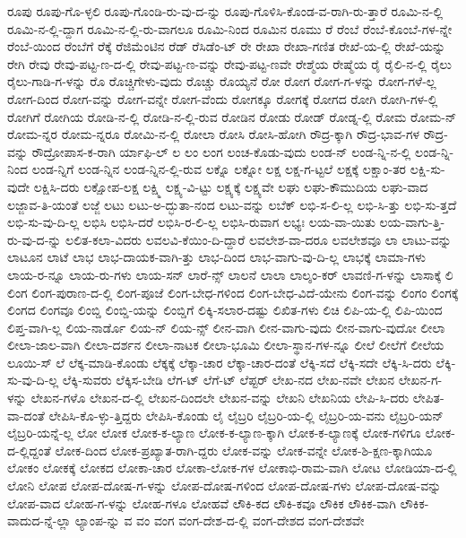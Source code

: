 {ರೂಪು
ರೂಪು-ಗೊ-ಳ್ಳಲಿ
ರೂಪು-ಗೊಂಡಿ-ರು-ವು-ದ-ನ್ನು
ರೂಪು-ಗೊಳಿಸಿ-ಕೊಂಡ-ವ-ರಾಗಿ-ರು-ತ್ತಾರೆ
ರೂಮಿ-ನ-ಲ್ಲಿ
ರೂಮಿ-ನ-ಲ್ಲಿ-ದ್ದಾಗ
ರೂಮಿ-ನ-ಲ್ಲಿ-ರು-ವಾಗಲೂ
ರೂಮಿ-ನಿಂದ
ರೂಮಿನ
ರೂಮು
ರೆ
ರೆಂಬೆ
ರೆಂಬೆ-ಕೊಂಬೆ-ಗಳ-ನ್ನೇ
ರೆಂಬೆ-ಯಿಂದ
ರೆಂಬೆಗೆ
ರೆಕ್ಕೆ
ರೆಜಿಮೆಂಟಿನ
ರೆಡ್
ರೆಸಿಡೆಂ-ಟ್
ರೇ
ರೇಖಾ
ರೇಖಾ-ಗಣಿತ
ರೇಖೆ-ಯ-ಲ್ಲಿ
ರೇಖೆ-ಯನ್ನು
ರೇಗಿ
ರೇವು
ರೇವು-ಪಟ್ಟ-ಣ-ದ-ಲ್ಲಿ
ರೇವು-ಪಟ್ಟ-ಣ-ವನ್ನು
ರೇವು-ಪಟ್ಟ-ಣವೇ
ರೇಶ್ಮೆಯ
ರೇಷ್ಮೆಯ
ರೈ
ರೈಲಿ-ನ-ಲ್ಲಿ
ರೈಲು
ರೈಲು-ಗಾಡಿ-ಗ-ಳನ್ನು
ರೊ
ರೊಚ್ಚಿಗೇಳು-ವುದು
ರೊಚ್ಚು
ರೊಯ್ಯನೆ
ರೋ
ರೋಗ
ರೋಗ-ಗ-ಳನ್ನು
ರೋಗ-ಗಳೆ-ಲ್ಲ
ರೋಗ-ದಿಂದ
ರೋಗ-ವನ್ನು
ರೋಗ-ವನ್ನೇ
ರೋಗ-ವೆಂದು
ರೋಗಕ್ಕೂ
ರೋಗಕ್ಕೆ
ರೋಗದ
ರೋಗಿ
ರೋಗಿ-ಗಳ-ಲ್ಲಿ
ರೋಗಿಗೆ
ರೋಗಿಯ
ರೋಡಿ-ನ-ಲ್ಲಿ
ರೋಡಿ-ನ-ಲ್ಲಿ-ರುವ
ರೋಡಿನ
ರೋಡು
ರೋಡ್
ರೋಡ್ನ-ಲ್ಲಿ
ರೋಮ
ರೋಮ-ನ್
ರೋಮ-ನ್ನರ
ರೋಮ-ನ್ನರೂ
ರೋಮಿ-ನ-ಲ್ಲಿ
ರೋಲಾ
ರೋಸಿ
ರೋಸಿ-ಹೋಗಿ
ರೌದ್ರ-ಕ್ಕಾಗಿ
ರೌದ್ರ-ಭಾವ-ಗಳ
ರೌದ್ರ-ವನ್ನು
ರೌದ್ರೋಪಾಸ-ಕ-ರಾಗಿ
ರ್ಯಾಫಿ-ಲ್
ಲ
ಲಂ
ಲಂಗ
ಲಂಚ-ಕೊಡು-ವುದು
ಲಂಡ-ನ್
ಲಂಡ-ನ್ನಿ-ನ-ಲ್ಲಿ
ಲಂಡ-ನ್ನಿ-ನಿಂದ
ಲಂಡ-ನ್ನಿಗೆ
ಲಂಡ-ನ್ನಿನ
ಲಂಡ-ನ್ನಿನ-ಲ್ಲಿ-ರುವ
ಲಕ್ನೊ
ಲಕ್ನೋ
ಲಕ್ಷ
ಲಕ್ಷ-ಗ-ಟ್ಟಲೆ
ಲಕ್ಷಕ್ಕೆ
ಲಕ್ಷಾಂ-ತರ
ಲಕ್ಷಿ-ಸು-ವುದೇ
ಲಕ್ಷಿಸಿ-ದರು
ಲಕ್ಷೋಪ-ಲಕ್ಷ
ಲಕ್ಷ್ಮಿ
ಲಕ್ಷ್ಯ-ವಿ-ಟ್ಟು
ಲಕ್ಷ್ಯಕ್ಕೆ
ಲಕ್ಷ್ಯವೇ
ಲಘು
ಲಘು-ಕೌಮುದಿಯ
ಲಘು-ವಾದ
ಲಜ್ಜಾವ-ತಿ-ಯಂತೆ
ಲಜ್ಜೆ
ಲಟು
ಲಟು-ಅ-ದ್ಭುತಾ-ನಂದ
ಲಟು-ವನ್ನು
ಲಬೆಕ್
ಲಭಿ-ಸ-ಲಿ-ಲ್ಲ
ಲಭಿ-ಸಿ-ತ್ತು
ಲಭಿ-ಸು-ತ್ತದೆ
ಲಭಿ-ಸು-ವು-ದಿ-ಲ್ಲ
ಲಭಿಸಿ
ಲಭಿಸಿ-ದರೆ
ಲಭಿಸಿ-ರ-ಲಿ-ಲ್ಲ
ಲಭಿಸಿ-ರುವಾಗ
ಲಭ್ಯಃ
ಲಯ-ವಾ-ಯಿತು
ಲಯ-ವಾಗು-ತ್ತಿ-ರು-ವು-ದ-ನ್ನು
ಲಲಿತ-ಕಲಾ-ವಿದರು
ಲವಲವಿ-ಕೆಯಿಂ-ದಿ-ದ್ದಾರೆ
ಲವಲೇಶ-ವಾ-ದರೂ
ಲವಲೇಶವೂ
ಲಾ
ಲಾಟು-ವನ್ನು
ಲಾಟೂನ
ಲಾಟೆ
ಲಾಭ
ಲಾಭ-ದಾಯಕ-ವಾಗಿ-ತ್ತು
ಲಾಭ-ದಿಂದ
ಲಾಭ-ವಾಗು-ವು-ದಿ-ಲ್ಲ
ಲಾಭಕ್ಕೆ
ಲಾಮಾ-ಗಳು
ಲಾಯ-ರ-ನ್ನೂ
ಲಾಯ-ರು-ಗಳು
ಲಾಯ-ಸನ್
ಲಾರೆ-ನ್ಸ್
ಲಾಲನೆ
ಲಾಲಾ
ಲಾಲ್ಶಂ-ಕರ್
ಲಾವಣಿ-ಗ-ಳನ್ನು
ಲಾಸಾಕ್ಕೆ
ಲಿ
ಲಿಂಗ
ಲಿಂಗ-ಪುರಾಣ-ದ-ಲ್ಲಿ
ಲಿಂಗ-ಪೂಜೆ
ಲಿಂಗ-ಬೇಧ-ಗಳಿಂದ
ಲಿಂಗ-ಬೇಧ-ವಿದೆ-ಯೇನು
ಲಿಂಗ-ವನ್ನು
ಲಿಂಗಂ
ಲಿಂಗಕ್ಕೆ
ಲಿಂಗದ
ಲಿಂಗವೂ
ಲಿಂಬ್ಡಿ
ಲಿಂಬ್ಡಿ-ಯನ್ನು
ಲಿಂಬ್ಡಿಗೆ
ಲಿಕ್ಕಿ-ಸಲಾರ-ದಷ್ಟು
ಲಿಖಿತ-ಗಳು
ಲಿಚಿ
ಲಿಪಿ-ಯ-ಲ್ಲಿ
ಲಿಪಿ-ಯಿಂದ
ಲಿಪ್ತ-ವಾಗಿ-ಲ್ಲ
ಲಿಯ-ನಾರ್ಡೊ
ಲಿಯ-ನ್
ಲಿಯ-ನ್ಸ್
ಲೀನ-ವಾಗಿ
ಲೀನ-ವಾಗು-ವುದು
ಲೀನ-ವಾಗು-ವುದೋ
ಲೀಲಾ
ಲೀಲಾ-ಜಾಲ-ವಾಗಿ
ಲೀಲಾ-ದರ್ಶನ
ಲೀಲಾ-ನಾಟಕ
ಲೀಲಾ-ಭೂಮಿ
ಲೀಲಾ-ಸ್ಥಾನ-ಗಳ-ನ್ನೂ
ಲೀಲೆ
ಲೀಲೆಗೆ
ಲೀಲೆಯ
ಲೂಯಿ-ಸ್
ಲೆ
ಲೆಕ್ಕ-ಮಾಡಿ-ಕೊಂಡು
ಲೆಕ್ಕಕ್ಕೆ
ಲೆಕ್ಕಾ-ಚಾರ
ಲೆಕ್ಕಾ-ಚಾರ-ದಂತೆ
ಲೆಕ್ಕಿ-ಸದೆ
ಲೆಕ್ಕಿ-ಸದೇ
ಲೆಕ್ಕಿ-ಸಿ-ದರು
ಲೆಕ್ಕಿ-ಸು-ವು-ದಿ-ಲ್ಲ
ಲೆಕ್ಕಿ-ಸುವರು
ಲೆಕ್ಕಿಸ-ಬೇಡಿ
ಲೆಗ-ಟ್
ಲೆಗೆ-ಟ್
ಲೆಪ್ಟರ್
ಲೇಖ-ನದ
ಲೇಖ-ನವೇ
ಲೇಖನ
ಲೇಖನ-ಗ-ಳನ್ನು
ಲೇಖನ-ಗಳೊ
ಲೇಖನ-ದ-ಲ್ಲಿ
ಲೇಖನ-ದಿಂದಲೇ
ಲೇಖನ-ವನ್ನು
ಲೇಖನಿ
ಲೇಖನಿಯ
ಲೇಪಿ-ಸಿ-ದರು
ಲೇಪಿತ-ವಾ-ದಂತೆ
ಲೇಪಿಸಿ-ಕೊ-ಳ್ಳು-ತ್ತಿದ್ದರು
ಲೇಪಿಸಿ-ಕೊಂಡು
ಲೈ
ಲೈಬ್ರರಿ
ಲೈಬ್ರರಿ-ಯ-ಲ್ಲಿ
ಲೈಬ್ರರಿ-ಯ-ವನು
ಲೈಬ್ರರಿ-ಯನ್
ಲೈಬ್ರರಿ-ಯನ್ನೆ-ಲ್ಲ
ಲೋ
ಲೋಕ
ಲೋಕ-ಕ-ಲ್ಯಾಣ
ಲೋಕ-ಕ-ಲ್ಯಾಣ-ಕ್ಕಾಗಿ
ಲೋಕ-ಕ-ಲ್ಯಾಣಕ್ಕೆ
ಲೋಕ-ಗಳಿಗೂ
ಲೋಕ-ದ-ಲ್ಲಿದ್ದಂತೆ
ಲೋಕ-ದಿಂದ
ಲೋಕ-ಪ್ರಖ್ಯಾತ-ರಾಗಿ-ದ್ದರು
ಲೋಕ-ವನ್ನು
ಲೋಕ-ವನ್ನೇ
ಲೋಕ-ಶಿ-ಕ್ಷಣ-ಕ್ಕಾಗಿಯೂ
ಲೋಕಂ
ಲೋಕಕ್ಕೆ
ಲೋಕದ
ಲೋಕಾ-ಚಾರ
ಲೋಕಾ-ಲೋಕ-ಗಳ
ಲೋಕಾಭಿ-ರಾಮ-ವಾಗಿ
ಲೋಟ
ಲೋಡಿಯಾ-ದ-ಲ್ಲಿ
ಲೋನಿ
ಲೋಪ
ಲೋಪ-ದೋಷ-ಗ-ಳನ್ನು
ಲೋಪ-ದೋಷ-ಗಳಿಂದ
ಲೋಪ-ದೋಷ-ಗಳು
ಲೋಪ-ದೋಷ-ವನ್ನು
ಲೋಪ-ವಾದ
ಲೋಹ-ಗ-ಳನ್ನು
ಲೋಹ-ಗಳೂ
ಲೋಹವೆ
ಲೌಕಿ-ಕದ
ಲೌಕಿ-ಕವೂ
ಲೌಕಿಕ
ಲೌಕಿಕ-ವಾಗಿ
ಲೌಕಿಕ-ವಾದುದ-ನ್ನೆ-ಲ್ಲಾ
ಲ್ಯಾಂಪ-ನ್ನು
ವ
ವಂ
ವಂಗ
ವಂಗ-ದೇಶ-ದ-ಲ್ಲಿ
ವಂಗ-ದೇಶದ
ವಂಗ-ದೇಶವೇ
}
